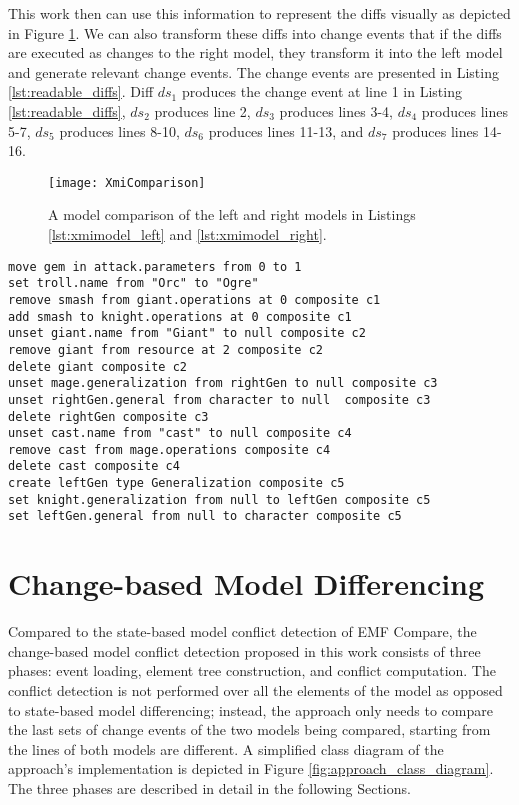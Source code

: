This work then can use this information to represent the diffs visually as depicted in Figure \ref{fig:xmi_comparison}. We can also transform these diffs into change events that if the diffs are executed as changes to the right model, they transform it into the left model and generate relevant change events. The change events are presented in Listing \ref{lst:readable_diffs}. Diff $ds_{1}$ produces the change event at line 1 in Listing \ref{lst:readable_diffs}, $ds_{2}$ produces line 2, $ds_{3}$ produces lines 3-4, $ds_{4}$ produces lines 5-7, $ds_{5}$ produces lines 8-10, $ds_{6}$ produces lines 11-13, and $ds_{7}$ produces lines 14-16.

\begin{figure}[ht]
  \texttt{[image: XmiComparison]}
  \caption{A model comparison of the left and right models in Listings \ref{lst:xmimodel_left} and \ref{lst:xmimodel_right}.}
  \label{fig:xmi_comparison}
\end{figure}

\vspace{-20pt}
\begin{lstlisting}[firstnumber=1,style=eol,caption={The identified diffs presented as change events.},label=lst:readable_diffs]
move gem in attack.parameters from 0 to 1
set troll.name from "Orc" to "Ogre"
remove smash from giant.operations at 0 composite c1
add smash to knight.operations at 0 composite c1
unset giant.name from "Giant" to null composite c2
remove giant from resource at 2 composite c2
delete giant composite c2
unset mage.generalization from rightGen to null composite c3
unset rightGen.general from character to null  composite c3
delete rightGen composite c3
unset cast.name from "cast" to null composite c4
remove cast from mage.operations composite c4
delete cast composite c4
create leftGen type Generalization composite c5
set knight.generalization from null to leftGen composite c5
set leftGen.general from null to character composite c5
\end{lstlisting}

\section{Change-based Model Differencing}
\label{sec:change_based_approach_for_comparing_models}
Compared to the state-based model conflict detection of EMF Compare, the change-based model conflict detection proposed in this work consists of three phases: event loading, element tree construction, and conflict computation.
The conflict detection is not performed over all the elements of the model as opposed to state-based model differencing; instead, the approach only needs to compare the last sets of change events of the two models being compared, starting from the lines of both models are different. A simplified class diagram of the approach's implementation \cite{epsilonlabs2019emfcbp} is depicted in Figure \ref{fig:approach_class_diagram}. The three phases are described in detail in the following Sections.

